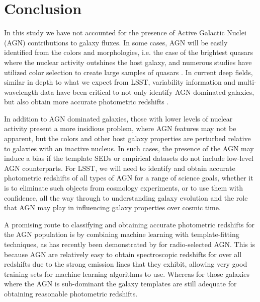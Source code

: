 \section{Conclusion}
\label{sec:conclusion}



In this study we have not accounted for the presence of Active Galactic Nuclei (AGN) contributions to galaxy fluxes. In some cases, AGN will be easily identified from the colors and morphologies, i.e. the case of the brightest quasars where the nuclear activity outshines the host galaxy, and numerous studies have utilized color selection to create large samples of quasars \citep[e.g.][]{Richards:06,Maddox:08,Richards:15}.  In current deep fields, similar in depth to what we expect from LSST, variability information and multi-wavelength data have been critical to not only identify AGN dominated galaxies, but also obtain more accurate photometric redshifts \citep[e.g][]{Salvato:11}.

In addition to AGN dominated galaxies, those with lower levels of nuclear activity present a more insidious problem, where AGN features may not be apparent, but the colors and other host galaxy properties are perturbed relative to galaxies with an inactive nucleus.  In such cases, the presence of the AGN may induce a bias if the template SEDs or empirical datasets do not include low-level AGN counterparts.
For LSST, we will need to identify and obtain accurate photometric redshifts of all types of AGN for a range of science goals, whether it is to eliminate such objects from cosmology experiments, or to use them with confidence, all the way through to understanding galaxy evolution and the role that AGN may play in influencing galaxy properties over cosmic time.

A promising route to classifying and obtaining accurate photometric redshifts for the AGN population is by combining machine learning with template-fitting techniques, as has recently been demonstrated by \citet{Duncan:18} for radio-selected AGN. This is because AGN are relatively easy to obtain spectroscopic redshifts for over all redshifts due to the strong emission lines that they exhibit, allowing very good training sets for machine learning algorithms to use. Whereas for those galaxies where the AGN is sub-dominant the galaxy templates are still adequate for obtaining reasonable photometric redshifts.

